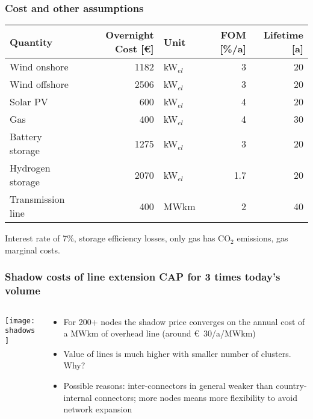 \documentclass[10pt,aspectratio=169,dvipsnames]{beamer}
\def\co2{CO${}_2$}
\def\el{${}_{el}$}
\let\olditem\item
\renewcommand{\item}{%
\olditem\vspace{5pt}}
\begin{document}
\begin{frame}
  \frametitle{Cost and other assumptions}

  \begin{table}
\centering
\begin{tabular}{@{}lrlrr@{}}
\toprule
Quantity                &Overnight  Cost [\euro]  &Unit & FOM [\%/a] & Lifetime [a] \\
\midrule
Wind onshore    &1182   &kW\el &3 & 20   \\
Wind offshore  &2506   &kW\el  &3& 20  \\
Solar PV           &600   &kW\el &4 & 20   \\
Gas             &400    &kW\el  &4& 30  \\
Battery storage         &1275   &kW\el  & 3 & 20 \\
Hydrogen storage        &2070   &kW\el  & 1.7 &20 \\
Transmission line       &400    &MWkm & 2 & 40\\
\bottomrule
\end{tabular}
\end{table}
  Interest rate of 7\%, storage efficiency losses, only gas has \co2 emissions, gas marginal costs.
\end{frame}


\begin{frame}
  \frametitle{Shadow costs of line extension CAP for 3 times today's volume}



\begin{columns}[T]
\begin{column}{8.5cm}
\centering
  \texttt{[image: shadows]}
\end{column}
\begin{column}{6cm}
  \begin{itemize}
  \item For 200+ nodes the shadow price converges on the annual cost of a MWkm of overhead line (around \euro~30/a/MWkm)
  \item Value of lines is much higher with smaller number of clusters. Why?
\item Possible reasons: inter-connectors in general weaker than country-internal connectors;  more nodes means more flexibility to avoid network expansion
  \end{itemize}
\end{column}
\end{columns}
\end{frame}
\end{document}
